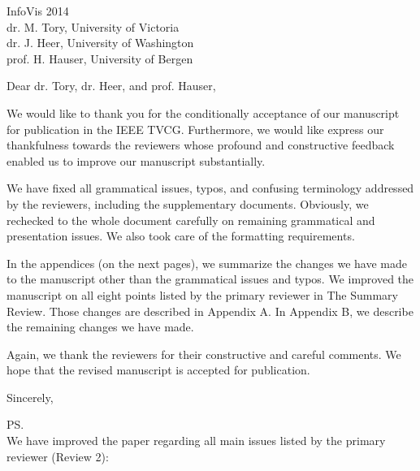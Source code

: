 \documentclass{letter}
\begin{document}
\begin{letter}{InfoVis 2014 \\ dr. M. Tory, University of Victoria \\ dr. J. Heer, University of Washington \\ prof. H. Hauser, University of Bergen}
\opening{Dear dr. Tory, dr. Heer, and prof. Hauser,}

We would like to thank you for the conditionally acceptance of our manuscript for publication in the IEEE TVCG. Furthermore, we would like express our thankfulness towards the reviewers whose profound and constructive feedback enabled us to improve our manuscript substantially.

We have fixed all grammatical issues, typos, and confusing terminology addressed by the reviewers, including the supplementary documents. Obviously, we rechecked to the whole document carefully on remaining grammatical and presentation issues. We also took care of the formatting requirements.

In the appendices (on the next pages), we summarize the changes we have made to the manuscript other than the grammatical issues and typos. We improved the manuscript on all eight points listed by the primary reviewer in The Summary Review. Those changes are described in Appendix A. In Appendix B, we describe the remaining changes we have made.

Again, we thank the reviewers for their constructive and careful comments. We hope that the revised manuscript is accepted for publication.

\closing{Sincerely,}

\ps
\newpage
{} \\

We have improved the paper regarding all main issues listed by the primary reviewer (Review 2):


\end{letter}
\end{document}
